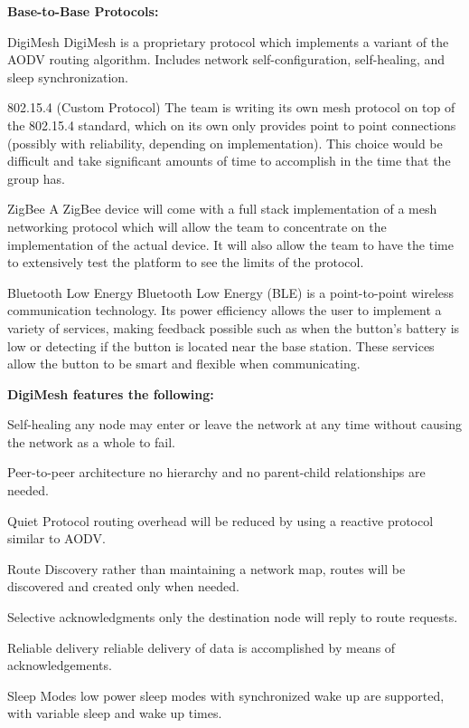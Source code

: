 \documentclass[journal,compsoc]{IEEEtran}
\begin{document}
\textbf {Base-to-Base Protocols:}

\begin{LaTeXdescription}
  \item [DigiMesh] DigiMesh is a proprietary protocol which implements a variant of the AODV routing algorithm. Includes network self-configuration, self-healing, and sleep synchronization.
  \item [802.15.4  (Custom Protocol)] The team is writing its own mesh protocol on top of the 802.15.4 standard, which on its own only provides point to point connections (possibly with reliability, depending on implementation). This choice would be difficult and take significant amounts of time to accomplish in the time that the group has.
  \item [ZigBee] A ZigBee device will come with a full stack implementation of a mesh networking protocol which will allow the team to concentrate on the implementation of the actual device. It will also allow the team to have the time to extensively test the platform to see the limits of the protocol.
  \item [Bluetooth Low Energy] Bluetooth Low Energy (BLE) is a point-to-point wireless communication technology.  Its power efficiency allows the user to implement a variety of services, making feedback possible such as when the button’s battery is low or detecting if the button is located near the base station.  These services allow the button to be smart and flexible when communicating.
\end{LaTeXdescription}

\textbf {DigiMesh features the following:}

\begin{LaTeXdescription}
  \item[Self-healing] any node may enter or leave the network at any time without causing the network as a whole to fail.
  \item[Peer-to-peer architecture] no hierarchy and no parent-child relationships are needed.
  \item[Quiet Protocol] routing overhead will be reduced by using a reactive protocol similar to AODV.
  \item[Route Discovery] rather than maintaining a network map, routes will be discovered and created only when needed.
  \item[Selective acknowledgments] only the destination node will reply to route requests.
  \item[Reliable delivery] reliable delivery of data is accomplished by means of acknowledgements.
  \item[Sleep Modes] low power sleep modes with synchronized wake up are supported, with variable sleep and wake up times.
\end{LaTeXdescription}
\end{document}
